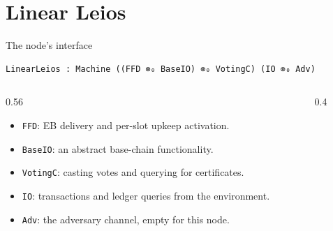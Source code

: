 \documentclass[aspectratio=169,10pt]{beamer}
\newcommand{\agda}[1]{\texttt{#1}}
\begin{document}
\section{Linear Leios}

\begin{frame}[fragile]{The node's interface}
\begin{verbatim}
LinearLeios : Machine ((FFD ⊗₀ BaseIO) ⊗₀ VotingC) (IO ⊗₀ Adv)
\end{verbatim}
  \begin{columns}[c]
    \begin{column}{0.56\textwidth}
      \begin{itemize}
        \item \agda{FFD}: EB delivery and per-slot upkeep activation.
        \item \agda{BaseIO}: an abstract base-chain functionality.
        \item \agda{VotingC}: casting votes and querying for certificates.
        \item \agda{IO}: transactions and ledger queries from the
              environment.
        \item \agda{Adv}: the adversary channel, empty for this node.
      \end{itemize}
    \end{column}
    \begin{column}{0.4\textwidth}
      \centering
    \end{column}
  \end{columns}
\end{frame}
\end{document}
